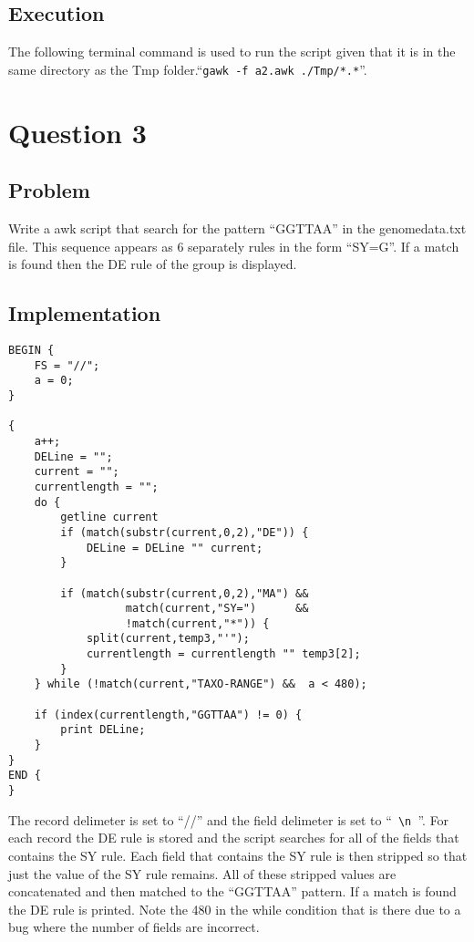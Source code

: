 \documentclass[a4paper, 10pt]{article}
\begin{document}
\subsection*{Execution}The following terminal command is used to run the script given that it is in the same directory as the Tmp folder.``\verb#gawk -f a2.awk ./Tmp/*.*#''.
\section*{Question 3}
\subsection*{Problem}Write a awk script that search for the pattern ``GGTTAA'' in the genomedata.txt file. This sequence appears as 6 separately rules in the form ``SY=G''. If a match is found then the DE rule of the group is displayed.\subsection*{Implementation}
\begin{verbatim}
BEGIN {    
    FS = "//";    
    a = 0;
}

{   
    a++;    
    DELine = "";    
    current = "";    
    currentlength = "";    
    do {        
        getline current        
        if (match(substr(current,0,2),"DE")) {
            DELine = DELine "" current;        
        }        
        
        if (match(substr(current,0,2),"MA") &&  
                  match(current,"SY=")      &&
                  !match(current,"*")) {              
            split(current,temp3,"'");              
            currentlength = currentlength "" temp3[2];
        }    
    } while (!match(current,"TAXO-RANGE") &&  a < 480);      
    
    if (index(currentlength,"GGTTAA") != 0) {
        print DELine;
    }
} 
END {
}
\end{verbatim}
The record delimeter is set to ``//'' and the field delimeter is set to ``\verb# \n #''. For each record the DE rule is stored and the script searches for all of the fields that contains the SY rule. Each field that contains the SY rule is then stripped so that just the value of the SY rule remains. All of these stripped values are concatenated and then matched to the ``GGTTAA'' pattern. If a match is found the DE rule is printed. Note the 480 in the while condition that is there due to a bug where the number of fields are incorrect.
\end{document}
